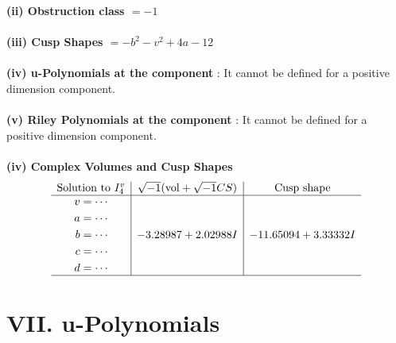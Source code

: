 \documentclass[1p]{elsarticle_modified}
\theoremstyle{definition}
\newcommand{\I}{\sqrt{-1}}
\begin{document}
\flushleft \textbf{(ii) Obstruction class $= -1$}\\~\\
\flushleft \textbf{(iii) Cusp Shapes $= - b^2- v^2+4 a-12$}\\~\\
\flushleft \textbf{(iv) u-Polynomials at the component} : It cannot be defined for a positive dimension component.\\~\\
\flushleft \textbf{(v) Riley Polynomials at the component} : It cannot be defined for a positive dimension component.\\~\\
\newpage\flushleft \textbf{(iv) Complex Volumes and Cusp Shapes}
$$\begin{array}{c|c|c} 
\text{Solution to }I^v_{4}& \I (\text{vol} + \sqrt{-1}CS) & \text{Cusp shape}\\
 \hline 
\begin{aligned}
v &= \cdots \\
a &= \cdots \\
b &= \cdots \\
c &= \cdots \\
d &= \cdots\end{aligned}
 & -3.28987 + 2.02988 I & -11.65094 + 3.33332 I\\
 \hline 
 \end{array}
$$
\newpage\renewcommand{\arraystretch}{1}
\centering \section*{ VII. u-Polynomials}
\end{document}
